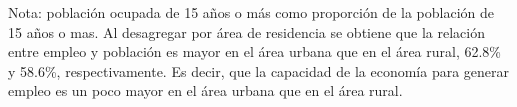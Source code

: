 Nota: población ocupada de 15 años o más como proporción de la población de 15 años o mas. Al desagregar por área de residencia se obtiene que la relación entre empleo y población es mayor en el área urbana que en el área rural, 62.8\% y 58.6\%, respectivamente. Es decir, que la capacidad de la economía para generar empleo es un poco mayor en el área urbana que en el área rural.